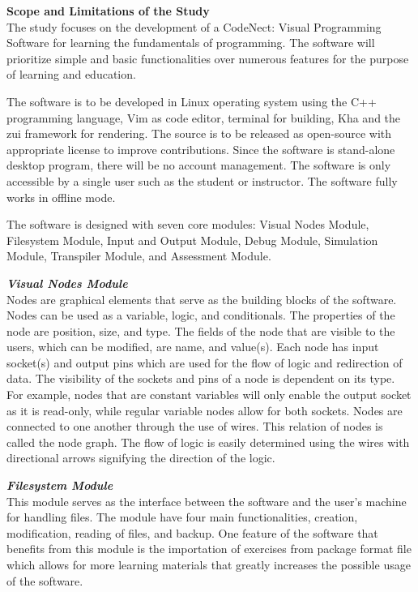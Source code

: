 \flushleft
\textbf{Scope and Limitations of the Study}\\
\justifying
\parx
The study focuses on the development of a CodeNect: Visual Programming Software
for learning the fundamentals of programming. The software will prioritize
simple and basic functionalities over numerous features for the purpose of
learning and education.

The software is to be developed in Linux operating system using the C++ programming
language, Vim as code editor, terminal for building, Kha and the zui framework for
rendering.
The source is to be released as open-source with appropriate license to improve
contributions. Since the software is stand-alone desktop program, there will be no
account management. The software is only accessible by a single user such as the
student or instructor.
The software fully works in offline mode.

The software is designed with seven core modules: Visual Nodes Module,
Filesystem Module, Input and Output Module, Debug Module, Simulation Module,
Transpiler Module, and Assessment Module.

\flushleft
\textbf{\textit{Visual Nodes Module}}\\
\justifying
\parx
Nodes are graphical elements that serve as the building blocks of the software.
Nodes can be used as a variable, logic, and conditionals. The properties of the node
are position, size, and type. The fields of the node that are visible to the
users, which can be modified, are name, and value(s). Each node has input
socket(s) and output pins which are used for the flow of logic and redirection
of data. The visibility of the sockets and pins of a node is dependent on its
type.  For example, nodes that are constant variables will only enable the
output socket as it is read-only, while regular variable nodes allow for both
sockets.  Nodes are connected to one another through the use of wires. This
relation of nodes is called the node graph. The flow of logic is easily
determined using the wires with directional arrows signifying the direction of
the logic.

\flushleft
\textbf{\textit{Filesystem Module}}\\
\justifying
\parx
This module serves as the interface between the software and the user's machine for
handling files. The module have four main functionalities, creation, modification,
reading of files, and backup. One feature of the software that benefits from this
module is the importation of exercises from package format file which allows for
more learning materials that greatly increases the possible usage of the software.

